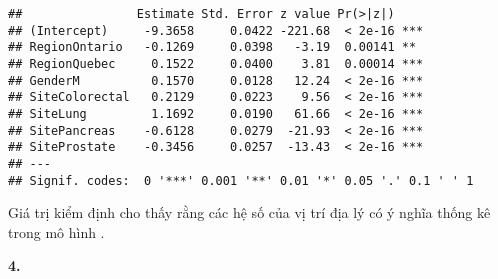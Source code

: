 \documentclass[
]{article}
\begin{document}
\begin{verbatim}
##                Estimate Std. Error z value Pr(>|z|)    
## (Intercept)     -9.3658     0.0422 -221.68  < 2e-16 ***
## RegionOntario   -0.1269     0.0398   -3.19  0.00141 ** 
## RegionQuebec     0.1522     0.0400    3.81  0.00014 ***
## GenderM          0.1570     0.0128   12.24  < 2e-16 ***
## SiteColorectal   0.2129     0.0223    9.56  < 2e-16 ***
## SiteLung         1.1692     0.0190   61.66  < 2e-16 ***
## SitePancreas    -0.6128     0.0279  -21.93  < 2e-16 ***
## SiteProstate    -0.3456     0.0257  -13.43  < 2e-16 ***
## ---
## Signif. codes:  0 '***' 0.001 '**' 0.01 '*' 0.05 '.' 0.1 ' ' 1
\end{verbatim}

Giá trị kiểm định cho thấy rằng các hệ số của vị trí địa lý có ý nghĩa
thống kê trong mô hình .

\textbf{4.}
\end{document}
